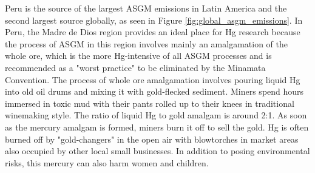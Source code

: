 \begin{flushleft}
Peru is the source of the largest ASGM emissions in Latin America and the second largest source globally, as seen in Figure \ref{fig:global_asgm_emissions}. In Peru, the Madre de Dios region provides an ideal place for Hg research because the process of ASGM in this region involves mainly an amalgamation of the whole ore, which is the more Hg-intensive of all ASGM processes and is recommended as a "worst practice" to be eliminated by the Minamata Convention\cite{unep_global_2017}. The process of whole ore amalgamation involves pouring liquid Hg into old oil drums and mixing it with gold-flecked sediment. Miners spend hours immersed in toxic mud with their pants rolled up to their knees in traditional winemaking style. The ratio of liquid Hg to gold amalgam is around 2:1\cite{fraser_peruvian_2009,swenson_gold_2011,veiga_origin_2006}. As soon as the mercury amalgam is formed, miners burn it off to sell the gold. Hg is often burned off by "gold-changers" in the open air with blowtorches in market areas also occupied by other local small businesses. In addition to posing environmental risks, this mercury can also harm women and children\cite{diringer_river_2015}. 
\end{flushleft}

